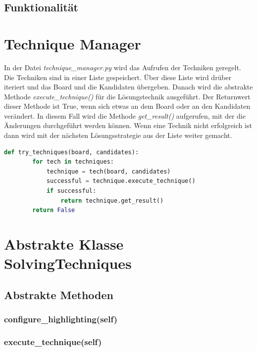 \subsection{Funktionalität}



\section{Technique Manager}
In der Datei \textit{technique\_manager.py} wird das Aufrufen der Techniken geregelt. Die Techniken sind in einer Liste gespeichert. Über diese Liste wird drüber iteriert und das Board und die Kandidaten übergeben. Danach wird die abstrakte Methode \textit{execute\_technique()} für die Lösungstechnik ausgeführt. Der Returnwert dieser Methode ist True, wenn sich etwas an dem Board oder an den Kandidaten verändert. In diesem Fall wird die Methode \textit{get\_result()} aufgerufen, mit der die Änderungen durchgeführt werden können.
Wenn eine Technik nicht erfolgreich ist dann wird mit der nächsten Lösungsstrategie aus der Liste weiter gemacht. 

\begin{lstlisting}[language=Python, caption={Funktion um eine anwendbare Lösungstechnik zu finden}, label={lst:try}]
	def try_techniques(board, candidates):
		for tech in techniques:
			technique = tech(board, candidates)
			successful = technique.execute_technique()
			if successful:
				return technique.get_result()
		return False
\end{lstlisting}

\section{Abstrakte Klasse SolvingTechniques}

\subsection{Abstrakte Methoden}

\subsubsection{configure\_highlighting(self)}
\subsubsection{execute\_technique(self)}
